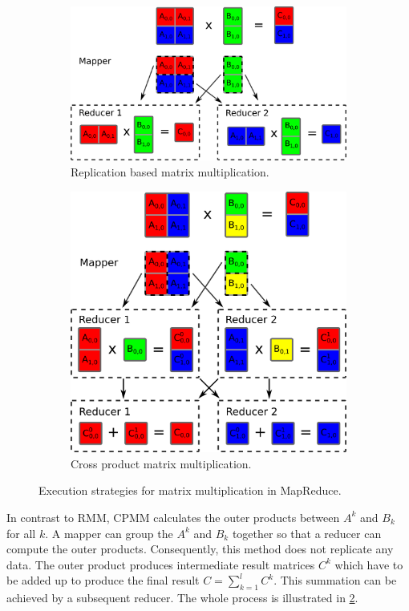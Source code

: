 \begin{figure}[h!]
	\centering
	\begin{subfigure}[b]{.49\linewidth}
		\centering
		\includegraphics[width=0.99\linewidth]{images/rmm.png}
		\caption{Replication based matrix multiplication.}
		\label{fig:RMM}
	\end{subfigure}
	\hfill
	\begin{subfigure}[b]{.49\linewidth}
		\centering
		\includegraphics[width=0.8\linewidth]{images/cpmm.png}
		\caption{Cross product matrix multiplication.}
		\label{fig:CPMM}
	\end{subfigure}
	\caption{Execution strategies for matrix multiplication in MapReduce.}
	\label{fig:MMs}
\end{figure}

In contrast to RMM, CPMM calculates the outer products between $A^k$ and $B_k$ for all $k$. 
A mapper can group the $A^k$ and $B_k$ together so that a reducer can compute the outer products. 
Consequently, this method does not replicate any data. 
The outer product produces intermediate result matrices $C^k$ which have to be added up to produce the final result $C=\sum_{k=1}^{l} C^k$. 
This summation can be achieved by a subsequent reducer. 
The whole process is illustrated in \cref{fig:CPMM}. 

